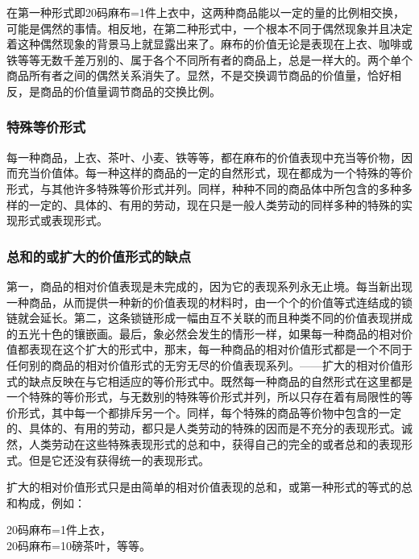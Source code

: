 \documentclass{ctexbook}
\begin{document}
            在第一种形式即20码麻布=1件上衣中，这两种商品能以一定的量的比例相交换，可能是偶然的事情。相反地，在第二种形式中，一个根本不同于偶然现象并且决定着这种偶然现象的背景马上就显露出来了。麻布的价值无论是表现在上衣、咖啡或铁等等无数千差万别的、属于各个不同所有者的商品上，总是一样大的。两个单个商品所有者之间的偶然关系消失了。显然，不是交换调节商品的价值量，恰好相反，是商品的价值量调节商品的交换比例。

            \subsubsection{特殊等价形式}

            每一种商品，上衣、茶叶、小麦、铁等等，都在麻布的价值表现中充当等价物，因而充当价值体。每一种这样的商品的一定的自然形式，现在都成为一个特殊的等价形式，与其他许多特殊等价形式并列。同样，种种不同的商品体中所包含的多种多样的一定的、具体的、有用的劳动，现在只是一般人类劳动的同样多种的特殊的实现形式或表现形式。

            \subsubsection{总和的或扩大的价值形式的缺点}

            第一，商品的相对价值表现是未完成的，因为它的表现系列永无止境。每当新出现一种商品，从而提供一种新的价值表现的材料时，由一个个的价值等式连结成的锁链就会延长。第二，这条锁链形成一幅由互不关联的而且种类不同的价值表现拼成的五光十色的镶嵌画。最后，象必然会发生的情形一样，如果每一种商品的相对价值都表现在这个扩大的形式中，那末，每一种商品的相对价值形式都是一个不同于任何别的商品的相对价值形式的无穷无尽的价值表现系列。——扩大的相对价值形式的缺点反映在与它相适应的等价形式中。既然每一种商品的自然形式在这里都是一个特殊的等价形式，与无数别的特殊等价形式并列，所以只存在着有局限性的等价形式，其中每一个都排斥另一个。同样，每个特殊的商品等价物中包含的一定的、具体的、有用的劳动，都只是人类劳动的特殊的因而是不充分的表现形式。诚然，人类劳动在这些特殊表现形式的总和中，获得自己的完全的或者总和的表现形式。但是它还没有获得统一的表现形式。
            
            扩大的相对价值形式只是由简单的相对价值表现的总和，或第一种形式的等式的总和构成，例如：
            
            \begin{center}
                20码麻布=1件上衣，\\
                20码麻布=10磅茶叶，等等。
            \end{center}
            
\end{document}
